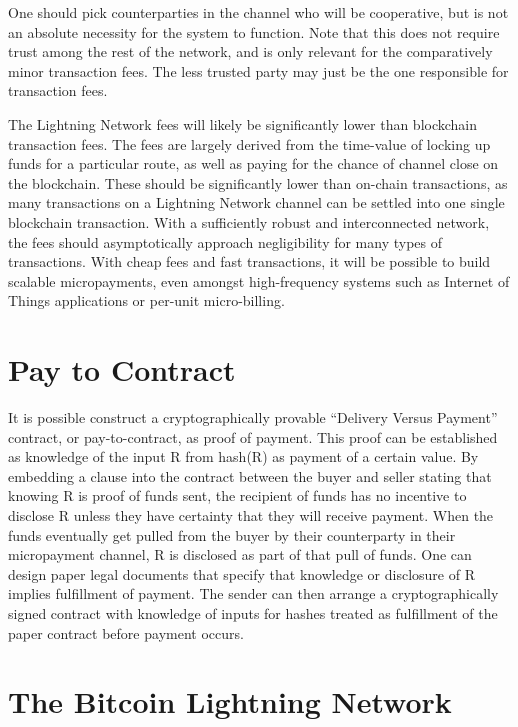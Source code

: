 \documentclass[letterpaper,11pt]{article}
\begin{document}
One should pick counterparties in the channel who will be cooperative, but is
not an absolute necessity for the system to function. Note that this does not
require trust among the rest of the network, and is only relevant for the
comparatively minor transaction fees. The less trusted party may just be the one
responsible for transaction fees.

The Lightning Network fees will likely be significantly lower than blockchain
transaction fees. The fees are largely derived from the time-value of locking up
funds for a particular route, as well as paying for the chance of channel close
on the blockchain. These should be significantly lower than on-chain
transactions, as many transactions on a Lightning Network channel can be settled
into one single blockchain transaction. With a sufficiently robust and
interconnected network, the fees should asymptotically approach negligibility
for many types of transactions. With cheap fees and fast transactions, it will
be possible to build scalable micropayments, even amongst high-frequency systems
such as Internet of Things applications or per-unit micro-billing.

\section{Pay to Contract}

It is possible construct a cryptographically provable ``Delivery Versus
Payment'' contract, or pay-to-contract\cite{paytocontract}, as proof of
payment. This proof can be established as knowledge of the input R from hash(R)
as payment of a certain value. By embedding a clause into the contract between
the buyer and seller stating that knowing R is proof of funds sent, the
recipient of funds has no incentive to disclose R unless they have certainty
that they will receive payment. When the funds eventually get pulled from the
buyer by their counterparty in their micropayment channel, R is disclosed as
part of that pull of funds. One can design paper legal documents that specify
that knowledge or disclosure of R implies fulfillment of payment. The sender can
then arrange a cryptographically signed contract with knowledge of inputs for
hashes treated as fulfillment of the paper contract before payment occurs.

\section{The Bitcoin Lightning Network}
\end{document}
